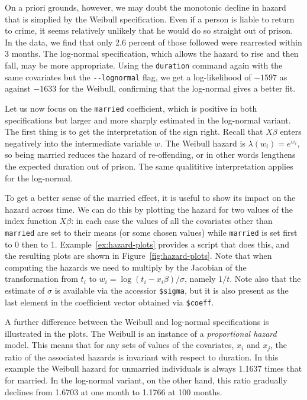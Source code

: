 On a priori grounds, however, we may doubt the monotonic decline in
hazard that is simplied by the Weibull specification. Even if a person
is liable to return to crime, it seems relatively unlikely that he
would do so straight out of prison. In the data, we find that only 2.6
percent of those followed were rearrested within 3 months. The
log-normal specification, which allows the hazard to rise and then
fall, may be more appropriate.  Using the \texttt{duration} command
again with the same covariates but the \verb|--lognormal| flag, we get
a log-likelihood of $-1597$ as against $-1633$ for the Weibull,
confirming that the log-normal gives a better fit.

Let us now focus on the \texttt{married} coefficient, which is
positive in both specifications but larger and more sharply estimated
in the log-normal variant. The first thing is to get the
interpretation of the sign right.  Recall that $X\beta$ enters
negatively into the intermediate variable $w$. The Weibull hazard is 
$\lambda(w_i) = e^{w_i}$, so being married reduces the hazard of
re-offending, or in other words lengthens the expected duration out of
prison.  The same qualititive interpretation applies for the
log-normal.  

To get a better sense of the married effect, it is useful to show its
impact on the hazard across time. We can do this by plotting the
hazard for two values of the index function $X\beta$: in each case the
values of all the covariates other than \texttt{married} are set to
their means (or some chosen values) while \texttt{married} is set
first to 0 then to 1. Example~\ref{ex:hazard-plots} provides a script
that does this, and the resulting plots are shown in
Figure~\ref{fig:hazard-plots}. Note that when computing the hazards we
need to multiply by the Jacobian of the transformation from $t_i$ to
$w_i = \log (t_i - x_i\beta)/\sigma$, namely $1/t$.  Note also that
the estimate of $\sigma$ is available via the accessior \verb|$sigma|,
but it is also present as the last element in the coefficient vector
obtained via \verb|$coeff|.

A further difference between the Weibull and log-normal specifications
is illustrated in the plots. The Weibull is an instance of a
\emph{proportional hazard} model. This means that for any sets of
values of the covariates, $x_i$ and $x_j$, the ratio of the associated
hazards is invariant with respect to duration. In this example the
Weibull hazard for unmarried individuals is always 1.1637 times that
for married. In the log-normal variant, on the other hand, this ratio
gradually declines from 1.6703 at one month to 1.1766 at 100 months.


